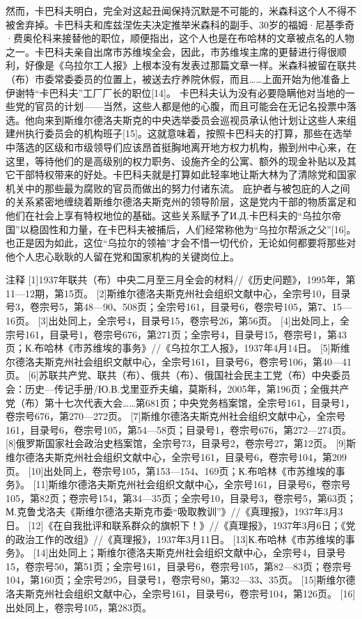 然而，卡巴科夫明白，完全对这起丑闻保持沉默是不可能的，米森科这个人不得不被舍弃掉。卡巴科夫和库兹涅佐夫决定推举米森科的副手、30岁的福姆·尼基季奇·费奥伦科来接替他的职位，顺便指出，这个人也是在布哈林的文章被点名的人物之一。卡巴科夫亲自出席市苏维埃全会，因此，市苏维埃主席的更替进行得很顺利，好像是《乌拉尔工人报》上根本没有发表过那篇文章一样。米森科被留在联共（布）市委常委委员的位置上，被送去疗养院休假，而且……上面开始为他准备上伊谢特“卡巴科夫”工厂厂长的职位[14]。
卡巴科夫认为没有必要隐瞒他对当地的一些党的官员的计划——当然，这些人都是他的心腹，而且可能会在无记名投票中落选。他向来到斯维尔德洛夫斯克的中央选举委员会巡视员承认他计划让这些人来组建州执行委员会的机构班子[15]。这就意味着，按照卡巴科夫的打算，那些在选举中落选的区级和市级领导们应该昂首挺胸地离开地方权力机构，搬到州中心来，在这里，等待他们的是高级别的权力职务、设施齐全的公寓、额外的现金补贴以及其它干部特权带来的好处。卡巴科夫就是打算如此轻率地让斯大林为了清除党和国家机关中的那些最为腐败的官员而做出的努力付诸东流。
庇护者与被包庇的人之间的关系紧密地缠绕着斯维尔德洛夫斯克州的领导阶层，这是党内干部的物质富足和他们在社会上享有特权地位的基础。这些关系赋予了И.Д.卡巴科夫的“乌拉尔帝国”以稳固性和力量，在卡巴科夫被捕后，人们经常称他为“乌拉尔帮派之父”[16]。也正是因为如此，这位“乌拉尔的领袖”才会不惜一切代价，无论如何都要将那些对他个人忠心耿耿的人留在党和国家机构的关键岗位上。

注释
[1]1937年联共（布）中央二月至三月全会的材料//《历史问题》，1995年，第11—12期，第15页。
[2]斯维尔德洛夫斯克州社会组织文献中心，全宗号10，目录号3，卷宗号5，第48—90、508页；全宗号161，目录号6，卷宗号105，第7、15—16页。
[3]出处同上，全宗号4，目录号15，卷宗号26，第56页。
[4]出处同上，全宗号161，目录号1，卷宗号676，第271页；全宗号4，目录号15，卷宗号1，第43页；К.布哈林《市苏维埃的事务》//《乌拉尔工人报》，1937年4月14日。
[5]斯维尔德洛夫斯克州社会组织文献中心，全宗号161，目录号6，卷宗号106，第40—41页。
[6]苏联共产党、联共（布）、俄共（布）、俄国社会民主工党（布）中央委员会：历史—传记手册/Ю.В.戈里亚乔夫编，莫斯科，2005年，第196页；全俄共产党（布）第十七次代表大会……第681页；中央党务档案馆，全宗号161，目录号1，卷宗号676，第270—272页。
[7]斯维尔德洛夫斯克州社会组织文献中心，全宗号161，目录号6，卷宗号105，第54—58页；目录号1，卷宗号676，第272—274页。
[8]俄罗斯国家社会政治史档案馆，全宗号73，目录号2，卷宗号27，第12页。
[9]斯维尔德洛夫斯克州社会组织文献中心，全宗号161，目录号6，卷宗号104，第209页。
[10]出处同上，卷宗号105，第153—154、169页；К.布哈林《市苏维埃的事务》。
[11]斯维尔德洛夫斯克州社会组织文献中心，全宗号161，目录号6，卷宗号105，第82页；卷宗号154，第34—35页；全宗号10，目录号3，卷宗号5，第63页；М.克鲁戈洛夫《斯维尔德洛夫斯克市委“吸取教训”》//《真理报》，1937年3月3日。
[12]《在自我批评和联系群众的旗帜下！》//《真理报》，1937年3月6日；《党的政治工作的改组》//《真理报》，1937年3月11日。
[13]К.布哈林《市苏维埃的事务》。
[14]出处同上；斯维尔德洛夫斯克州社会组织文献中心，全宗号4，目录号15，卷宗号50，第51页；全宗号161，目录号6，卷宗号105，第82—83页；卷宗号104，第160页；全宗号295，目录号1，卷宗号80，第32—33、35页。
[15]斯维尔德洛夫斯克州社会组织文献中心，全宗号161，目录号6，卷宗号104，第126页。
[16]出处同上，卷宗号105，第283页。

